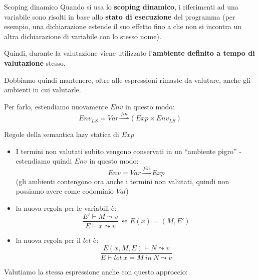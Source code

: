 \documentclass[a4paper,11pt]{report}
\begin{document}
\begin{defbox}{Scoping dinamico}{}
    Quando si usa lo \textbf{scoping dinamico}, i riferimenti ad una variabile sono risolti in base allo \textbf{stato di esecuzione} del programma (per esempio, una dichiarazione estende il suo effetto fino a che non si incontra un altra dichiarazione di variabile con lo stesso nome).

    Quindi, durante la valutazione viene utilizzato l'\textbf{ambiente definito a tempo di valutazione} stesso.
\end{defbox}

Dobbiamo quindi mantenere, oltre alle espressioni rimaste da valutare, anche gli ambienti in cui valutarle.

Per farlo, estendiamo nuovamente \( Env \) in questo modo:
\[ Env_{LS} = Var \overset{fin}{\rightharpoonup} (Exp \times Env_{LS}) \]


\begin{defbox}{Regole della semantica lazy statica di \(Exp\)}{}

   \begin{itemize}
    \item I termini non valutati subito vengono conservati in un ``ambiente pigro'' - estendiamo quindi \( Env \) in questo modo:
   \[ Env = Var \overset{fin}{\rightharpoonup} Exp \]
   (gli ambienti contengono ora anche i termini non valutati, quindi non possiamo avere come codominio \( Val \))

\item la nuova regola per le variabili è:
    \[ \frac{E'\vdash M \leadsto v}{E\vdash x \leadsto v} \ \ \text{se } E(x)=(M, E')\]

\item la nuova regola per il \( let \) è:
    \[ \frac{E(x, M, E)\vdash N \leadsto v}{E \vdash let \ x = M \ in \ N \leadsto v} \]

   \end{itemize}
\end{defbox}

Valutiamo la stessa espressione anche con questo approccio:

\begin{prooftree}
\end{prooftree}
\end{document}

